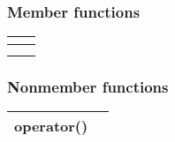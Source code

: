 \documentclass[letterpaper,10pt,english]{sphinxmanual}
\begin{document}
\subsubsection*{Member functions}


\begin{savenotes}\sphinxattablestart
\centering
\begin{tabulary}{\linewidth}[t]{|T|T|}
\hline

{\hyperref[\detokenize{programming-interface/runtime/device-selector:constructor}]{}}
&\\
\hline
{\hyperref[\detokenize{programming-interface/runtime/device-selector:destructor}]{}}
&\\
\hline
{\hyperref[\detokenize{programming-interface/runtime/device-selector:select-device}]{}}
&\\
\hline
\end{tabulary}
\par
\sphinxattableend\end{savenotes}
\subsubsection*{Non\sphinxhyphen{}member functions}


\begin{savenotes}\sphinxattablestart
\centering
\begin{tabulary}{\linewidth}[t]{|T|T|}
\hline

operator()
&\\
\hline
\end{tabulary}
\par
\sphinxattableend\end{savenotes}


\paragraph{}
\label{\detokenize{programming-interface/runtime/device-selector:constructor}}
\begin{sphinxVerbatim}[commandchars=\\\{\}]
  
   
\end{sphinxVerbatim}
\end{document}
